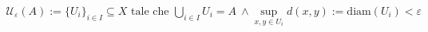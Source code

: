 \documentclass[preview]{standalone}
\begin{document}
\begin{align*}
\mathcal{U}_{\varepsilon}(A) := \{ U_i \}_{i \in I} \subseteq X \text{ tale che } \bigcup_{i \in I}  U_i = A \ \land \sup_{x,y \in  U_i } d(x,y) := \text{diam}( U_i ) <  \varepsilon
\end{align*}
\end{document}
